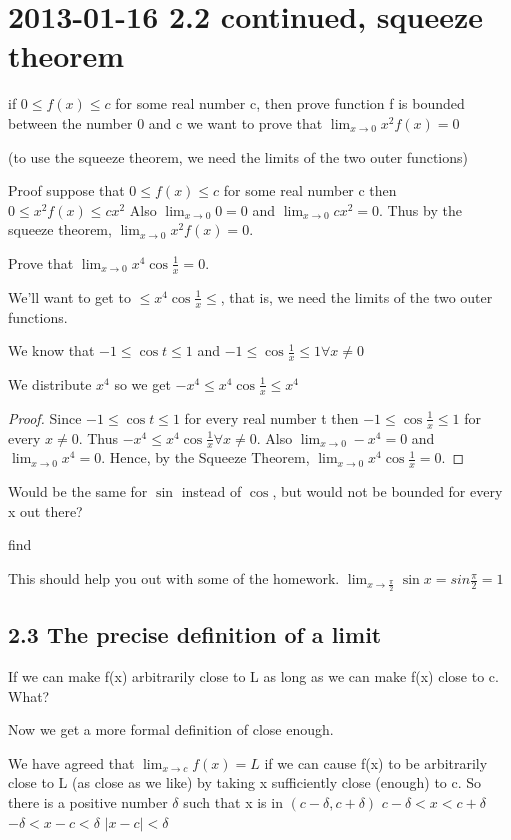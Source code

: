\documentclass[12pt]{article}
\begin{document}
\section{2013-01-16 2.2 continued, squeeze theorem}

if $0 \leq f(x) \leq c$ for some real number c, then prove
function f is bounded between the number 0 and c
we want to prove that $\lim_{x \to 0} x^2f(x) = 0$

(to use the squeeze theorem, we need the limits of the two outer functions)

Proof
suppose that  $0 \leq f(x) \leq c$ for some real number c then
$0 \leq x^2f(x) \leq cx^2$ Also $\lim_{x \to 0}0 = 0$ and $\lim_{x \to 0}cx^2 = 0$. Thus by the squeeze
theorem, $\lim_{x \to 0}x^2f(x) = 0$.

Prove that $\lim_{x \to 0}x^4 \cos \frac{1}{x} = 0$.

We'll want to get to $\leq x^4\cos \frac{1}{x} \leq$, that is, we need the limits of the two outer functions.

We know that $-1 \leq \cos t \leq 1$ and $-1 \leq \cos \frac{1}{x} \leq 1 \forall x \neq 0$

We distribute $x^4$ so we get $-x^4 \leq x^4 \cos \frac{1}{x} \leq x^4$

\begin{proof}
Since $-1 \leq \cos t \leq 1$ for every real number t then $-1 \leq \cos \frac{1}{x} \leq 1$ for every $x \neq
0$. Thus $-x^4 \leq x^4 \cos \frac{1}{x} \forall x \neq 0$. Also $\lim_{x \to 0} -x^4 = 0$ and $\lim_{x \to 0}
x^4 = 0$. Hence, by the Squeeze Theorem, $\lim_{x \to 0} x^4 \cos \frac{1}{x} = 0.$
\end{proof}
Would be the same for $\sin$ instead of $\cos$, but would not be bounded for every x out there?

find

This should help you out with some of the homework.
$\lim_{x \to \frac{\pi}{2}} \sin x = sin \frac{\pi}{2} = 1$

\subsection{2.3 The precise definition of a limit}
If we can make f(x) arbitrarily close to L as long as we can make f(x) close to c. What?

Now we get a more formal definition of close enough.

We have agreed that $\lim_{x \to c}f(x) = L$ if we can cause f(x) to be arbitrarily close to L (as close as we
like) by taking x sufficiently close (enough) to c.
So there is a positive number $\delta$ such that x is in $(c-\delta, c+\delta)$
$c- \delta < x < c + \delta$
$-\delta < x -c < \delta$
$|x - c| < \delta$
\end{document}
